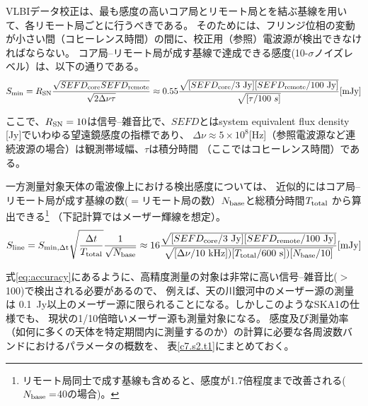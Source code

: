 VLBIデータ校正は、最も感度の高いコア局とリモート局とを結ぶ基線を用いて、各リモート局ごとに行うべきである。
そのためには、フリンジ位相の変動が小さい間（コヒーレンス時間）の間に、校正用（参照）電波源が検出できなければならない。
コア局--リモート局が成す基線で達成できる感度(10-$σ$ノイズレベル）は、以下の通りである。
\begin{equation}
S_{\rm min} = R_{\rm SN}\frac{\sqrt{SEFD_{\rm core}SEFD_{\rm remote}}}{\sqrt{2\Delta\nu\tau}}\approx 
0.55\frac{\sqrt{[SEFD_{\rm core}/{\rm 3~Jy}][SEFD_{\rm remote}/{\rm 100~Jy}]}}{\sqrt{[\tau/100~s]}} [{\rm mJy}]
\label{eq:baseline-sensitivity}
\end{equation}

\noindent
ここで、$R_{\rm SN}=10$は信号--雑音比で、$SEFD$とはsystem equivalent flux density [Jy]でいわゆる望遠鏡感度の指標であり、
$\Delta\nu\approx 5\times 10^8$[Hz]（参照電波源など連続波源の場合）は観測帯域幅、$\tau$は積分時間
（ここではコヒーレンス時間）である。

一方測量対象天体の電波像上における検出感度については、
近似的にはコア局--リモート局が成す基線の数($=$リモート局の数）$N_{\rm base}$と総積分時間$T_{\rm total}$
から算出できる\footnote
{リモート局同士で成す基線も含めると、感度が1.7倍程度まで改善される($N_{\rm base}=$40の場合)。}
（下記計算ではメーザー輝線を想定）。
\begin{equation}
S_{\rm line} = S_{\rm min, \Delta t}\sqrt{\frac{\Delta t}{T_{\rm total}}}\frac{1}{\sqrt{N_{\rm base}}}
\approx 
16\frac{\sqrt{[SEFD_{\rm core}/{\rm 3~Jy}][SEFD_{\rm remote}/{\rm 100~Jy}]}}
{\sqrt{[\Delta\nu/{\rm 10~kHz}])[T_{\rm total}/{\rm 600~s]})[N_{\rm base}/{\rm 10}]}}[{\rm mJy}]
\label{eq:array-sensitivity}
\end{equation}

\noindent
式\ref{eq:accuracy}にあるように、高精度測量の対象は非常に高い信号--雑音比($>$100)で検出される必要があるので、
例えば、天の川銀河中のメーザー源の測量は
0.1~Jy以上のメーザー源に限られることになる。しかしこのようなSKA1の仕様でも、
現状の1/10倍暗いメーザー源も測量対象になる。
感度及び測量効率（如何に多くの天体を特定期間内に測量するのか）の計算に必要な各周波数バンドにおけるパラメータの概数を、
表\ref{c7.s2.t1}にまとめておく。

